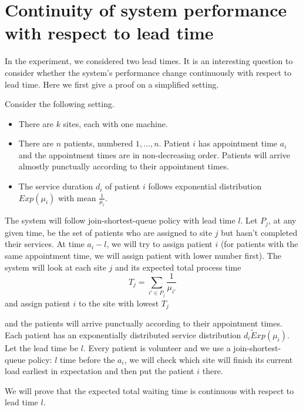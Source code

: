 \section{Continuity of system performance with respect to lead time}

In the experiment, we considered two lead times. It is an interesting question
to consider whether the system's performance change continuously with respect to
lead time. Here we first give a proof on a simplified setting.

Consider the following setting.
\begin{itemize}
\item There are $k$ sites, each with one machine.
\item There are $n$ patients, numbered $1,\ldots,n$. Patient $i$
      has appointment time $a_i$ and the appointment times are
      in non-decreasing order. Patients will arrive almostly
      punctually
      according to their appointment times.
\item The service duration $d_i$ of patient $i$ follows exponential
      distribution $Exp(\mu_i)$ with mean $\frac{1}{\mu_i}$.
\end{itemize}
The system will follow join-shortest-queue policy with lead time $l$.
Let $P_j$, at any given time, be the set of patients who are assigned
to site $j$ but hasn't completed their services.
At time $a_i-l$, we will try to assign patient $i$ (for patients
with the same appointment time, we will assign patient with lower
number first). The system will look at each site $j$ and its
expected total process time
\[  T_j = \sum_{i' \in P_j} \frac{1}{\mu_{i'}}  \]
and assign patient $i$ to the site with lowest $T_j$

and the patients will arrive punctually according to their appointment times.
Each patient has an exponentially distributed service distribution $d_i \tilde Exp(\mu_i)$.
Let the lead time be $l$. Every patient is volunteer and we use a
join-shortest-queue policy: $l$ time before the $a_i$, we will check which site
will finish its current load earliest in expectation and then put the patient $i$ there.

We will prove that the expected total waiting time is continuous with
respect to lead time $l$.

